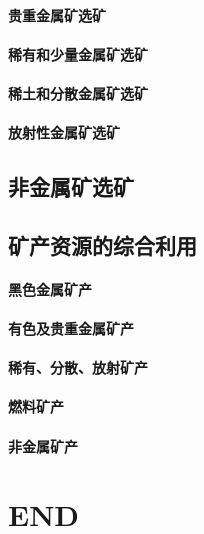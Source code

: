 \documentclass[UTF8]{../../ApplicationUniverse}
\begin{document}
    \subsubsection{贵重金属矿选矿}
    \subsubsection{稀有和少量金属矿选矿}
    \subsubsection{稀土和分散金属矿选矿}
    \subsubsection{放射性金属矿选矿}
\section{非金属矿选矿}
\section{矿产资源的综合利用}
    \subsubsection{黑色金属矿产}
    \subsubsection{有色及贵重金属矿产}
    \subsubsection{稀有、分散、放射矿产}
    \subsubsection{燃料矿产}
    \subsubsection{非金属矿产}


\chapter{END}
\end{document}
